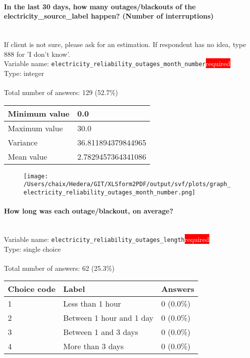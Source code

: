 \documentclass[11.5pt, a4paper]{scrartcl}
\begin{document}
\paragraph{In the last 30 days, how many outages/blackouts of the electricity\_source\_label happen? (Number of interruptions)}
\ \\ {\small If client is not sure, please ask for an estimation. If respondent has no idea, type 888 for 'I don't know'.}
\  \\Variable name: \texttt{electricity\_reliability\_outages\_month\_number}\hfill\colorbox{red}{\small{\textcolor{white}{required}}}\\
 Type: integer\\
\\Total number of answers: 129 (52.7\%)
\\[0.2em] \begin{tabular}{p{4cm}|p{8cm}}
Minimum value &0.0 \\
\hline
\cellcolor{mygray} Maximum value & \cellcolor{mygray}30.0 \\
\hline
Variance &36.811894379844965 \\
\hline
\cellcolor{mygray} Mean value & \cellcolor{mygray}2.7829457364341086 \\
\hline
\end{tabular}
\begin{figure}[H]
\centering
\texttt{[image: /Users/chaix/Hedera/GIT/XLSform2PDF/output/svf/plots/graph\_electricity\_reliability\_outages\_month\_number.png]}
\end{figure}
\paragraph{How long was each outage/blackout, on average? }
\  \\Variable name: \texttt{electricity\_reliability\_outages\_length}\hfill\colorbox{red}{\small{\textcolor{white}{required}}}\\
 Type: single choice\\
\\Total number of answers: 62 (25.3\%)
\\[0.2em] \begin{tabular}{p{4cm}|p{8cm}|p{3cm}}
Choice code & Label & Answers \\
\hline
1 & Less than 1 hour& \cellcolor{color0}0 (0.0\%)\\
\cellcolor{mygray} 2 & \cellcolor{mygray}Between 1 hour and 1 day & \cellcolor{color0}0 (0.0\%)\\
3 & Between 1 and 3 days& \cellcolor{color0}0 (0.0\%)\\
\cellcolor{mygray} 4 & \cellcolor{mygray}More than 3 days & \cellcolor{color0}0 (0.0\%)\\
\end{tabular}
\end{document}
